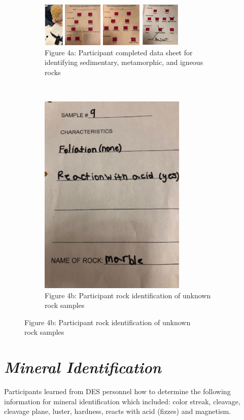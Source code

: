 \documentclass[11pt]{sig-alternate}
\begin{document}
\begin{large}
\begin{figure}
    \begin{subfigure}[a]{0.5\textwidth}
        \leftmargin
        \includegraphics[width=70mm]{figure4_1.png}
        \caption{Figure 4a: Participant completed data sheet for \\identifying sedimentary, metamorphic, and igneous rocks }
        \label{Participant completed data sheet }
    \end{subfigure}
    \hfill
\\
    \begin{subfigure}[b]{0.5\textwidth}
        \leftmargin
        \includegraphics[width=70mm]{figure4_2.png}
        \caption{ Figure 4b: Participant rock identification of unknown \\rock samples }
        \label{ Participant rock identification of unknown rock samples }
    \end{subfigure}

\end{figure}

\section*{\textit{Mineral Identification }}
Participants learned from DES personnel how to determine the following information for mineral identification which included: color streak, cleavage, cleavage plane, luster, hardness, reacts with acid (fizzes) and magnetism. 


\end{large}
\end{document}
